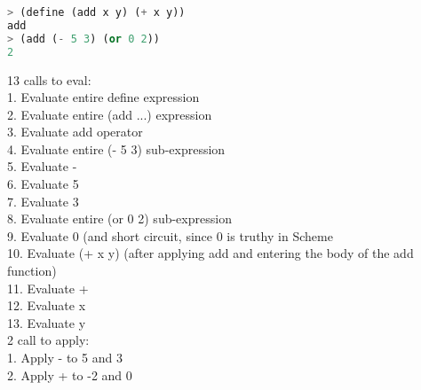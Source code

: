 \begin{lstlisting}[language=Scheme]
> (define (add x y) (+ x y))
add
> (add (- 5 3) (or 0 2))
2
\end{lstlisting}

\begin{solution}[1in]
13 calls to eval: \\
1. Evaluate entire define expression \\
2. Evaluate entire (add ...) expression \\
3. Evaluate add operator \\
4. Evaluate entire (- 5 3) sub-expression \\
5. Evaluate - \\
6. Evaluate 5 \\
7. Evaluate 3 \\
8. Evaluate entire (or 0 2) sub-expression \\
9. Evaluate 0 (and short circuit, since 0 is truthy in Scheme\\
10. Evaluate (+ x y) (after applying add and entering the body of the add function) \\
11. Evaluate + \\
12. Evaluate x \\
13. Evaluate y \\

2 call to apply: \\
1. Apply - to 5 and 3 \\
2. Apply + to -2 and 0 \\
\end{solution}


